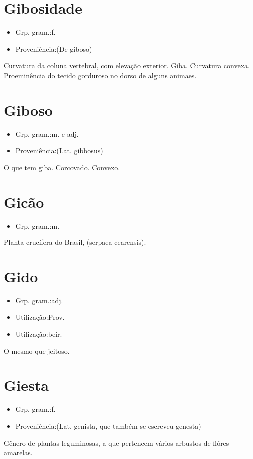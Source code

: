 \section{Gibosidade}
\begin{itemize}
\item {Grp. gram.:f.}
\end{itemize}
\begin{itemize}
\item {Proveniência:(De \textunderscore giboso\textunderscore )}
\end{itemize}
Curvatura da coluna vertebral, com elevação exterior.
Giba.
Curvatura convexa.
Proeminência do tecido gorduroso no dorso de alguns animaes.
\section{Giboso}
\begin{itemize}
\item {Grp. gram.:m.  e  adj.}
\end{itemize}
\begin{itemize}
\item {Proveniência:(Lat. \textunderscore gibbosus\textunderscore )}
\end{itemize}
O que tem giba.
Corcovado.
Convexo.
\section{Gicão}
\begin{itemize}
\item {Grp. gram.:m.}
\end{itemize}
Planta crucífera do Brasil, (\textunderscore serpaea cearensis\textunderscore ).
\section{Gido}
\begin{itemize}
\item {Grp. gram.:adj.}
\end{itemize}
\begin{itemize}
\item {Utilização:Prov.}
\end{itemize}
\begin{itemize}
\item {Utilização:beir.}
\end{itemize}
O mesmo que \textunderscore jeitoso\textunderscore .
\section{Giesta}
\begin{itemize}
\item {Grp. gram.:f.}
\end{itemize}
\begin{itemize}
\item {Proveniência:(Lat. \textunderscore genista\textunderscore , que também se escreveu \textunderscore genesta\textunderscore )}
\end{itemize}
Gênero de plantas leguminosas, a que pertencem vários arbustos de flôres amarelas.
